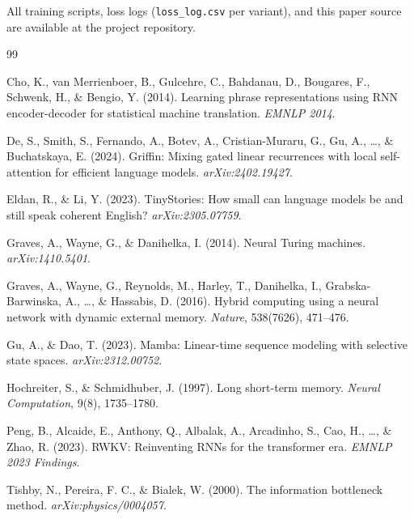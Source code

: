 \documentclass[11pt,a4paper]{article}
\begin{document}
All training scripts, loss logs (\texttt{loss\_log.csv} per variant), and
this paper source are available at the project repository.

\begin{thebibliography}{99}

Cho, K., van Merrienboer, B., Gulcehre, C., Bahdanau, D., Bougares, F.,
Schwenk, H., \& Bengio, Y. (2014).
Learning phrase representations using RNN encoder-decoder for statistical
machine translation.
\emph{EMNLP 2014}.

De, S., Smith, S., Fernando, A., Botev, A., Cristian-Muraru, G., Gu, A.,
\ldots, \& Buchatskaya, E. (2024).
Griffin: Mixing gated linear recurrences with local self-attention for
efficient language models.
\emph{arXiv:2402.19427}.

Eldan, R., \& Li, Y. (2023).
TinyStories: How small can language models be and still speak coherent
English?
\emph{arXiv:2305.07759}.

Graves, A., Wayne, G., \& Danihelka, I. (2014).
Neural Turing machines.
\emph{arXiv:1410.5401}.

Graves, A., Wayne, G., Reynolds, M., Harley, T., Danihelka, I.,
Grabska-Barwinska, A., \ldots, \& Hassabis, D. (2016).
Hybrid computing using a neural network with dynamic external memory.
\emph{Nature}, 538(7626), 471--476.

Gu, A., \& Dao, T. (2023).
Mamba: Linear-time sequence modeling with selective state spaces.
\emph{arXiv:2312.00752}.

Hochreiter, S., \& Schmidhuber, J. (1997).
Long short-term memory.
\emph{Neural Computation}, 9(8), 1735--1780.

Peng, B., Alcaide, E., Anthony, Q., Albalak, A., Arcadinho, S., Cao, H.,
\ldots, \& Zhao, R. (2023).
RWKV: Reinventing RNNs for the transformer era.
\emph{EMNLP 2023 Findings}.

Tishby, N., Pereira, F. C., \& Bialek, W. (2000).
The information bottleneck method.
\emph{arXiv:physics/0004057}.

\end{thebibliography}
\end{document}
